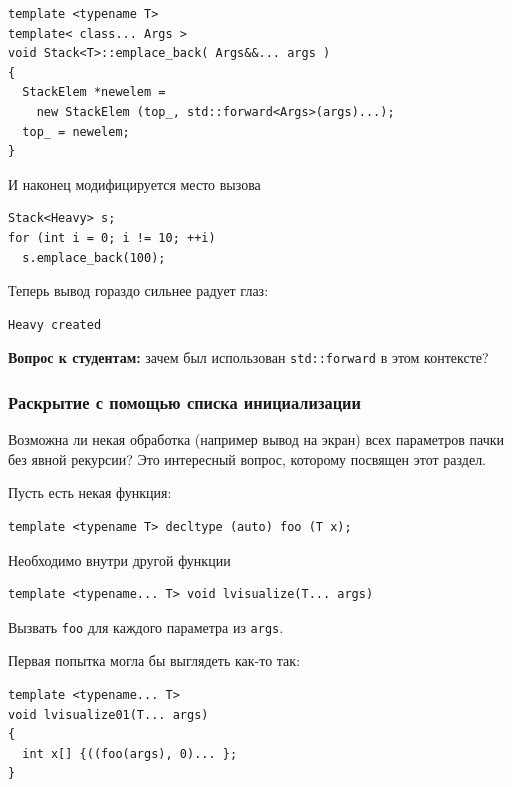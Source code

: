 \documentclass[a4paper,12pt,oneside]{article}
\newif\ifanswers
\begin{document}
\begin{lstlisting}
template <typename T>
template< class... Args >
void Stack<T>::emplace_back( Args&&... args )
{
  StackElem *newelem = 
    new StackElem (top_, std::forward<Args>(args)...);
  top_ = newelem;
}
\end{lstlisting}

И наконец модифицируется место вызова

\begin{lstlisting}
Stack<Heavy> s;
for (int i = 0; i != 10; ++i)
  s.emplace_back(100);
\end{lstlisting}

Теперь вывод гораздо сильнее радует глаз:

\begin{verbatim}
Heavy created
\end{verbatim}

\textbf{Вопрос к студентам:} зачем был использован \lstinline!std::forward! в этом контексте?

\ifanswers
Ответ: на случай если аргументы конструктора также имеют тяжелые копирующие конструкторы. Обобщённое программирование, что уж тут.
\fi

\subsubsection{Раскрытие с помощью списка инициализации}\label{ExpandInit}

Возможна ли некая обработка (например вывод на экран) всех параметров пачки без явной рекурсии? Это интересный вопрос, которому посвящен этот раздел.

Пусть есть некая функция:

\begin{lstlisting}
template <typename T> decltype (auto) foo (T x);
\end{lstlisting}

Необходимо внутри другой функции 

\begin{lstlisting}
template <typename... T> void lvisualize(T... args)
\end{lstlisting}

Вызвать \lstinline!foo! для каждого параметра из \lstinline!args!.

Первая попытка могла бы выглядеть как-то так:

\begin{lstlisting}
template <typename... T>
void lvisualize01(T... args)
{
  int x[] {((foo(args), 0)... };
}
\end{lstlisting}
\end{document}

